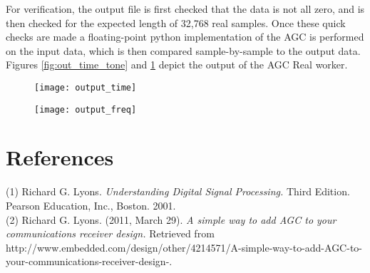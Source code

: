 \documentclass{article}
\begin{document}
\begin{flushleft}
	For verification, the output file is first checked that the data is not all zero, and is then checked for the expected length of 32,768 real samples. Once these quick checks are made a floating-point python implementation of the AGC is performed on the input data, which is then compared sample-by-sample to the output data. Figures \ref{fig:out_time_tone} and \ref{fig:out_freq_tone} depict the output of the AGC Real worker.
\end{flushleft}
\newpage

	\begin{figure}[ht]
		\centering
		\begin{minipage}{.5\textwidth}
			\centering\texttt{[image: output\_time]}
			\label{fig:out_time_tone}
		\end{minipage}%
		\begin{minipage}{.5\textwidth}
			\centering\texttt{[image: output\_freq]}
			\label{fig:out_freq_tone}
		\end{minipage}
	\end{figure}

\section*{References}
(1) Richard G. Lyons. \textit{Understanding Digital Signal Processing.} Third Edition. Pearson Education, Inc., Boston. 2001. \\
(2) Richard G. Lyons. (2011, March 29). \textit{A simple way to add AGC to your communications receiver design.} Retrieved from http://www.embedded.com/design/other/4214571/A-simple-way-to-add-AGC-to-your-communications-receiver-design-.
\end{document}
